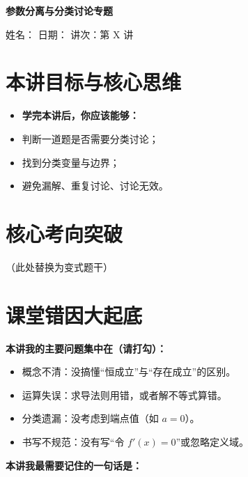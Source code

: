 \documentclass[11pt,a4paper]{ctexart}
\newcommand{\lessoninfo}[4]{%
  \begin{center}
    {\LARGE\bfseries #1}\par
    \vspace{0.8em}
    {\small 姓名：#2 \quad 日期：#3 \quad 讲次：#4}
  \end{center}
  \vspace{0.6em}
}
\begin{document}
\lessoninfo{参数分离与分类讨论专题}{\blank{2.6cm}}{\blank{2.6cm}}{第 X 讲}

\section{本讲目标与核心思维}

\begin{itemize}[itemsep=0.3em]
  \item \textbf{学完本讲后，你应该能够：}
  \item 判断一道题是否需要分类讨论；
  \item 找到分类变量与边界；
  \item 避免漏解、重复讨论、讨论无效。
\end{itemize}


\newpage

\section{核心考向突破}


{\small \qOneStem}


{\small \qOneStem（此处替换为变式题干）}

\newpage

\section{课堂错因大起底}

\vspace{0.5em}
\noindent\textbf{本讲我的主要问题集中在（请打勾）：}
\begin{itemize}[itemsep=0.4em]
  \item \checkbox 概念不清：没搞懂“恒成立”与“存在成立”的区别。
  \item \checkbox 运算失误：求导法则用错，或者解不等式算错。
  \item \checkbox 分类遗漏：没考虑到端点值（如 $a=0$）。
  \item \checkbox 书写不规范：没有写“令 $f'(x)=0$”或忽略定义域。
\end{itemize}

\vspace{1em}
\noindent\textbf{本讲我最需要记住的一句话是：}
\vspace{0.5em}

\blank{14cm}
\end{document}
